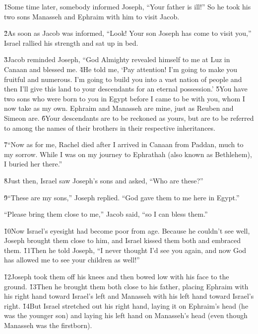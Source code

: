 \v{1}Some time later, somebody informed Joseph, ``Your father is ill!'' So he took his two sons Manasseh and Ephraim with him to visit Jacob.

\v{2}As soon as Jacob was informed, ``Look! Your son Joseph has come to visit you,'' Israel rallied his strength and sat up in bed.

\v{3}Jacob reminded Joseph, ``God Almighty revealed himself to me at Luz in Canaan and blessed me. \v{4}He told me, `Pay attention! I'm going to make you fruitful and numerous. I'm going to build you into a vast nation of people and then I'll give this land to your descendants for an eternal possession.' \v{5}You have two sons who were born to you in Egypt before I came to be with you, whom I now take as my own. Ephraim and Manasseh are mine, just as Reuben and Simeon are. \v{6}Your descendants are to be reckoned as yours, but are to be referred to among the names of their brothers in their respective inheritances.

\v{7}``Now as for me, Rachel died after I arrived in Canaan from Paddan, much to my sorrow. While I was on my journey to Ephrathah (also known as Bethlehem), I buried her there.''

\v{8}Just then, Israel saw Joseph's sons and asked, ``Who are these?''

\v{9}``These are my sons,'' Joseph replied. ``God gave them to me here in Egypt.''

``Please bring them close to me,'' Jacob said, ``so I can bless them.''

\v{10}Now Israel's eyesight had become poor from age. Because he couldn't see well, Joseph brought them close to him, and Israel kissed them both and embraced them. \v{11}Then he told Joseph, ``I never thought I'd see you again, and now God has allowed me to see your children as well!''

\v{12}Joseph took them off his knees and then bowed low with his face to the ground. \v{13}Then he brought them both close to his father, placing Ephraim with his right hand toward Israel's left and Manasseh with his left hand toward Israel's right. \v{14}But Israel stretched out his right hand, laying it on Ephraim's head (he was the younger son) and laying his left hand on Manasseh's head (even though Manasseh was the firstborn).

